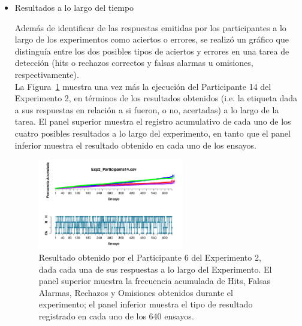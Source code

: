 \begin{itemize}
\item Resultados a lo largo del tiempo

Además de identificar de las respuestas emitidas por los participantes a lo largo de los experimentos como aciertos o errores, se realizó un gráfico que distinguía entre los dos posibles tipos de aciertos y errores en una tarea de detección (hits o rechazos correctos y falsas alarmas u omisiones, respectivamente).\\ 

La Figura~\ref{fig:Outcome_E1_P14} muestra una vez más la ejecución del Participante 14 del Experimento 2, en términos de los resultados obtenidos (i.e. la etiqueta dada a sus respuestas en relación a si fueron, o no, acertadas) a lo largo de la tarea. El panel superior muestra el registro acumulativo de cada uno de los cuatro posibles resultados a lo largo del experimento, en tanto que el panel inferior muestra el resultado obtenido en cada uno de los ensayos.\\ 

\begin{figure}[th]
\centering
\includegraphics[width=0.60\textwidth]{Figures/Outcome_Exp2_P14}
\caption[Resultado obtenido a lo largo del tiempo: Ejemplo]{Resultado obtenido por el Participante 6 del Experimento 2, dada cada una de sus respuestas a lo largo del Experimento. El panel superior muestra la frecuencia acumulada de Hits, Falsas Alarmas, Rechazos y Omisiones obtenidos durante el experimento; el panel inferior muestra el tipo de resultado registrado en cada uno de los 640 ensayos.}
\label{fig:Outcome_E1_P14}
\end{figure}


\end{itemize}











